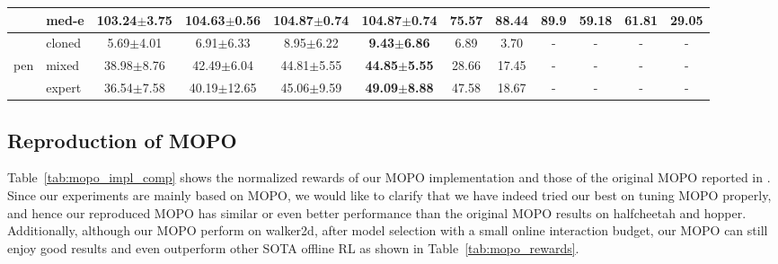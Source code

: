 \begin{table*}[!ht]
\begin{adjustbox}{center}
{\begin{tabular}{c|l|c|c|c|c|c|c|c|c|c|c}
        & med-e & 103.24$\pm$3.75\phantom{00} & 104.63$\pm$0.56\phantom{00} & \phantom{0}104.87$\pm$0.74 \phantom{0}& \textbf{104.87$\pm$0.74\phantom{0}} & 75.57 & 88.44 & 89.9 & 59.18 & 61.81 & 29.05\\
    \midrule
        & cloned & 5.69$\pm$4.01 & 6.91$\pm$6.33 & \phantom{0}8.95$\pm$6.22 & \textbf{\phantom{0}9.43$\pm$6.86} & 6.89 & 3.70 & - & - & - & -\\
        pen & mixed & 38.98$\pm$8.76\phantom{0} & 42.49$\pm$6.04\phantom{0} & 44.81$\pm$5.55 & \textbf{44.85$\pm$5.55} & 28.66 & 17.45 & - & - & - & -\\
        & expert & 36.54$\pm$7.58\phantom{0} & 40.19$\pm$12.65 & 45.06$\pm$9.59 & \textbf{49.09$\pm$8.88} & 47.58 & 18.67 & - & - & - & -\\
    \bottomrule
\end{tabular}}
\end{adjustbox}
\end{table*}

\newpage

\subsection{Reproduction of MOPO}
Table~\ref{tab:mopo_impl_comp} shows the normalized rewards of our MOPO implementation and those of the original MOPO reported in \citep{yu2020mopo}.
Since our experiments are mainly based on MOPO, we would like to clarify that we have indeed tried our best on tuning MOPO properly, and hence our reproduced MOPO has similar or even better performance than the original MOPO results on halfcheetah and hopper. Additionally, although our MOPO perform on walker2d, after model selection with a small online interaction budget, our MOPO can still enjoy good results and even outperform other SOTA offline RL as shown in Table~\ref{tab:mopo_rewards}.

